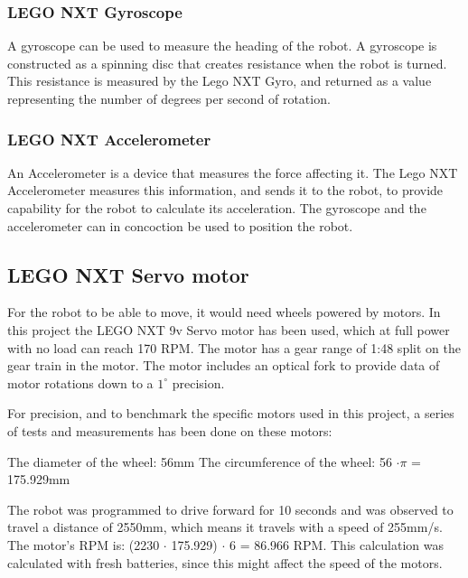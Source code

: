 \subsubsection{LEGO NXT Gyroscope}
\label{sec:LEGO NXT Gyroscope}
A gyroscope can be used to measure the heading of the robot. A gyroscope is constructed as a spinning disc that creates resistance when the robot is turned. This resistance is measured by the Lego NXT Gyro, and returned as a value representing the number of degrees per second of rotation. 

\subsubsection{LEGO NXT Accelerometer}
\label{sec:LEGO NXT Accelerometer}
An Accelerometer is a device that measures the force affecting it. The Lego NXT Accelerometer measures this information, and sends it to the robot, to provide capability for the robot to calculate its acceleration. The gyroscope and the accelerometer can in concoction be used to position the robot.

\subsection{LEGO NXT Servo motor}
\label{sec:LEGO NXT Servo motor}
For the robot to be able to move, it would need wheels powered by motors. In this project the LEGO NXT 9v Servo motor has been used, which at full power with no load can reach 170 RPM. The motor has a gear range of 1:48 split on the gear train in the motor. \citep{Servo} The motor includes an optical fork to provide data of motor rotations down to a \(1^{\circ}\) precision.

For precision, and to benchmark the specific motors used in this project, a series of tests and measurements has been done on these motors:

The diameter of the wheel: 56mm \newline
The circumference of the wheel: 56 \begin{math}\cdot \pi \end{math} = 175.929mm

The robot was programmed to drive forward for 10 seconds and was observed to travel a distance of 2550mm, which means it travels with a speed of 255mm/s. \newline
The motor’s RPM is: (2230 \begin{math} \cdot \end{math} 175.929) \begin{math} \cdot \end{math} 6 = 86.966 RPM. 
This calculation was calculated with fresh batteries, since this might affect the speed of the motors.

